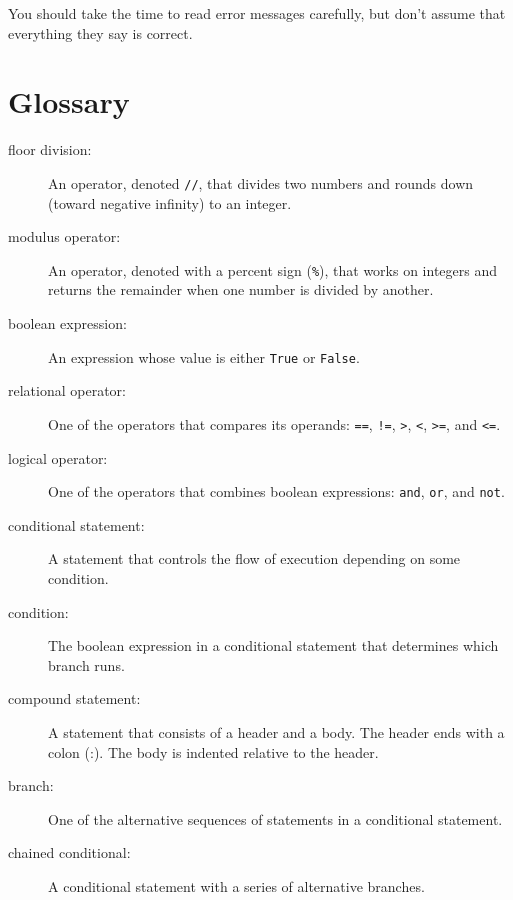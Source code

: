 \documentclass[10pt]{book}
\begin{document}
You should take the time to read error messages carefully, but don't
assume that everything they say is correct.


\section{Glossary}

\begin{description}

\item[floor division:] An operator, denoted {\tt //}, that divides two
  numbers and rounds down (toward negative infinity) to an integer.

\item[modulus operator:]  An operator, denoted with a percent sign
({\tt \%}), that works on integers and returns the remainder when one
number is divided by another.

\item[boolean expression:]  An expression whose value is either
{\tt True} or {\tt False}.

\item[relational operator:] One of the operators that compares
its operands: {\tt ==}, {\tt !=}, {\tt >}, {\tt <}, {\tt >=}, and {\tt <=}.

\item[logical operator:] One of the operators that combines boolean
expressions: {\tt and}, {\tt or}, and {\tt not}.

\item[conditional statement:]  A statement that controls the flow of
execution depending on some condition.

\item[condition:] The boolean expression in a conditional statement
that determines which branch runs.

\item[compound statement:]  A statement that consists of a header
and a body.  The header ends with a colon (:).  The body is indented
relative to the header.

\item[branch:] One of the alternative sequences of statements in
a conditional statement.

\item[chained conditional:]  A conditional statement with a series
of alternative branches.


\end{description}
\end{document}
